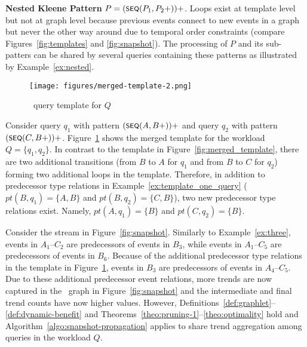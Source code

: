 \textbf{Nested Kleene Pattern} $P=(\textsf{\footnotesize SEQ}(P_1,P_2+))+$.
Loops exist at template level but not at graph level because previous events connect to new events in a graph but never the other way around due to temporal order constraints (compare Figures~\ref{fig:templates} and \ref{fig:snapshot}). 
The processing of $P$ and its sub-patters can be shared by several queries containing these patterns as illustrated by Example~\ref{ex:nested}. 

\begin{figure}[ht]
\centering
\texttt{[image: figures/merged-template-2.png]}
\caption{\app\ query template for $Q$}
\label{fig:merged-template-2}
\end{figure}

\begin{example}
Consider query $q_1$ with pattern $(\textsf{\footnotesize SEQ}(A,B+))+$ and query $q_2$ with pattern $(\textsf{\footnotesize SEQ}(C,B+))+$. Figure~\ref{fig:merged-template-2} shows the merged template for the workload $Q=\{q_1,q_2\}$.
In contrast to the template in Figure~\ref{fig:merged_template}, there are two additional transitions (from $B$ to $A$ for $q_1$ and from $B$ to $C$ for $q_2$) forming two additional loops in the template.
Therefore, in addition to predecessor type relations in Example~\ref{ex:template_one_query}
($pt(B,q_1) = \{A,B\}$ and 
$pt(B,q_2) = \{C,B\}$),
two new predecessor type relations exist. 
Namely,
$pt(A,q_1) = \{B\}$ and 
$pt(C,q_2) = \{B\}$. 

Consider the stream in Figure~\ref{fig:snapshot}.
Similarly to Example~\ref{ex:three},
events in $A_1$--$C_2$ are predecessors of events in $B_3$, 
while events in $A_1$--$C_5$ are predecessors of events in $B_6$. 
Because of the additional predecessor type relations in the template in Figure~\ref{fig:merged-template-2}, 
events in $B_3$ are predecessors of events in $A_4$--$C_5$.
Due to these additional predecessor event relations,
more trends are now captured in the \app\ graph in Figure~\ref{fig:snapshot} and the intermediate and final trend counts have now higher values.
However, 
Definitions~\ref{def:graphlet}--\ref{def:dynamic-benefit} and Theorems~\ref{theo:pruning-1}--\ref{theo:optimality} hold and 
Algorithm~\ref{algo:snapshot-propagation} applies to share trend aggregation among queries in the workload $Q$.
\label{ex:nested}
\end{example}




%
%
%
%


